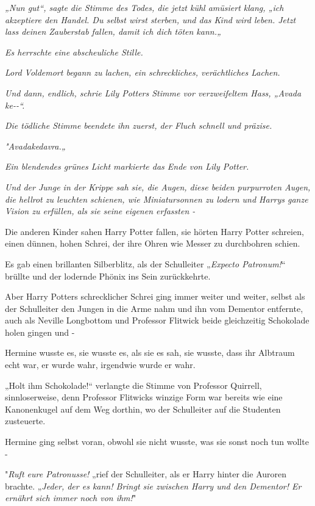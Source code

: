 {\emph{\emph{„Nun gut“, sagte die Stimme des Todes, die jetzt kühl amüsiert klang, „ich akzeptiere den Handel. Du selbst wirst sterben, und das Kind wird leben. Jetzt lass deinen Zauberstab fallen, damit ich dich töten kann.„}}

\emph{\emph{Es herrschte eine abscheuliche Stille.}}

\emph{\emph{Lord Voldemort begann zu lachen, ein schreckliches, verächtliches Lachen.}}

\emph{\emph{Und dann, endlich, schrie Lily Potters Stimme vor verzweifeltem Hass, „Avada ke-\/-“.}}

\emph{\emph{Die tödliche Stimme beendete ihn zuerst, der Fluch schnell und präzise.}}

\emph{\emph{"Avadakedavra.„}}

\emph{\emph{Ein blendendes grünes Licht markierte das Ende von Lily Potter.}}

\emph{\emph{Und der Junge in der Krippe sah sie, die Augen, diese beiden purpurroten Augen, die hellrot zu leuchten schienen, wie Miniatursonnen zu lodern und Harrys ganze Vision zu erfüllen, als sie seine eigenen erfassten -}}

\hfill\break Die anderen Kinder sahen Harry Potter fallen, sie hörten Harry Potter schreien, einen dünnen, hohen Schrei, der ihre Ohren wie Messer zu durchbohren schien.

Es gab einen brillanten Silberblitz, als der Schulleiter „\emph{Expecto Patronum!}“ brüllte und der lodernde Phönix ins Sein zurückkehrte.

Aber Harry Potters schrecklicher Schrei ging immer weiter und weiter, selbst als der Schulleiter den Jungen in die Arme nahm und ihn vom Dementor entfernte, auch als Neville Longbottom und Professor Flitwick beide gleichzeitig Schokolade holen gingen und -

Hermine wusste es, sie wusste es, als sie es sah, sie wusste, dass ihr Albtraum echt war, er wurde wahr, irgendwie wurde er wahr.

„Holt ihm Schokolade!“ verlangte die Stimme von Professor Quirrell, sinnloserweise, denn Professor Flitwicks winzige Form war bereits wie eine Kanonenkugel auf dem Weg dorthin, wo der Schulleiter auf die Studenten zusteuerte.

Hermine ging selbst voran, obwohl sie nicht wusste, was sie sonst noch tun wollte -

"\emph{Ruft eure Patronusse!} „rief der Schulleiter, als er Harry hinter die Auroren brachte. „\emph{Jeder, der es kann! Bringt sie zwischen Harry und den Dementor! Er} \emph{ernährt sich immer noch von ihm!}"

}
